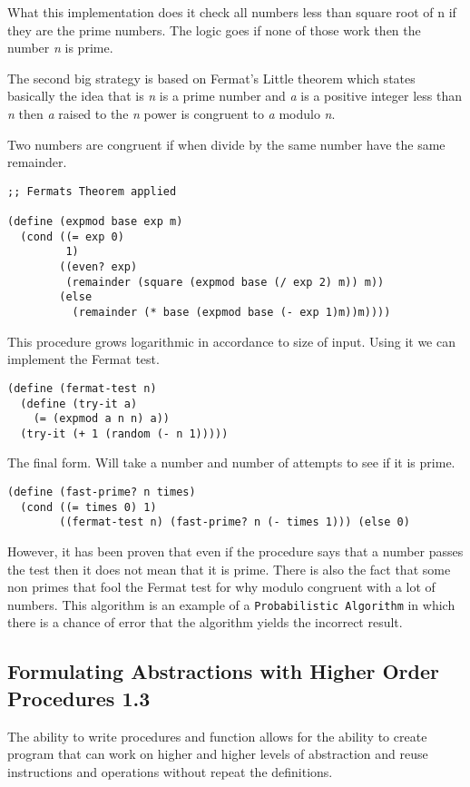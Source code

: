 \documentclass[11pt]{article}
\begin{document}
What this implementation does it check all numbers less than square root
of n if they are the prime numbers. The logic goes if none of those work
then the number \emph{n} is prime.

The second big strategy is based on Fermat's Little theorem which states
basically the idea that is \emph{n} is a prime number and \emph{a} is a positive
integer less than \emph{n} then \emph{a} raised to the \emph{n} power is congruent to
\emph{a} modulo \emph{n}.

Two numbers are congruent if when divide by the same number have the
same remainder.

\begin{verbatim}
;; Fermats Theorem applied

(define (expmod base exp m)
  (cond ((= exp 0)
         1)
        ((even? exp)
         (remainder (square (expmod base (/ exp 2) m)) m))
        (else
          (remainder (* base (expmod base (- exp 1)m))m))))
\end{verbatim}

This procedure grows logarithmic in accordance to size of input. Using
it we can implement the Fermat test.

\begin{verbatim}
(define (fermat-test n)
  (define (try-it a)
    (= (expmod a n n) a))
  (try-it (+ 1 (random (- n 1)))))
\end{verbatim}

The final form. Will take a number and number of attempts to see if it
is prime.

\begin{verbatim}
(define (fast-prime? n times)
  (cond ((= times 0) 1)
        ((fermat-test n) (fast-prime? n (- times 1))) (else 0)
\end{verbatim}

However, it has been proven that even if the procedure says that a
number passes the test then it does not mean that it is prime. There is
also the fact that some non primes that fool the Fermat test for why
modulo congruent with a lot of numbers. This algorithm is an example of
a \texttt{Probabilistic Algorithm} in which there is a chance of error that the
algorithm yields the incorrect result.

\subsection{Formulating Abstractions with Higher Order Procedures 1.3}
\label{sec:orgec1fa23}
The ability to write procedures and function allows for the ability to
create program that can work on higher and higher levels of abstraction
and reuse instructions and operations without repeat the definitions.
\end{document}
